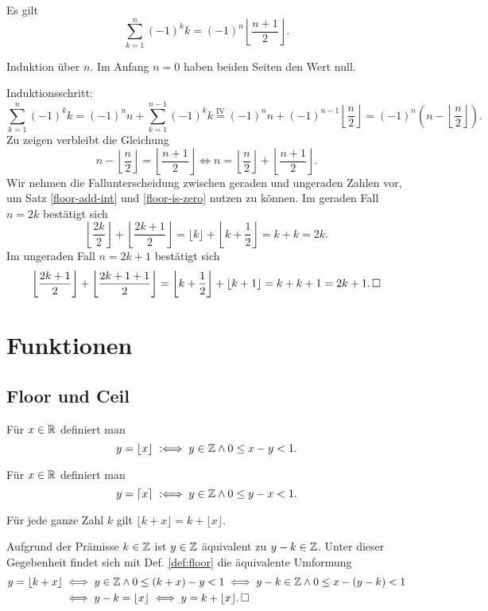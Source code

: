 \newpage
\begin{Satz} Es gilt
\[\sum_{k=1}^n (-1)^k k = (-1)^n\left\lfloor\frac{n+1}{2}\right\rfloor.\]
\end{Satz}
\begin{Beweis}
Induktion über $n$. Im Anfang $n=0$ haben beiden Seiten den Wert null.

Induktionsschritt:
\[\sum_{k=1}^n (-1)^k k = (-1)^n n + \sum_{k=1}^{n-1} (-1)^k k
\stackrel{\mathrm{IV}}= (-1)^n n + (-1)^{n-1}\left\lfloor\frac{n}{2}\right\rfloor
= (-1)^n (n-\left\lfloor\frac{n}{2}\right\rfloor).\]
Zu zeigen verbleibt die Gleichung
\[n-\left\lfloor\frac{n}{2}\right\rfloor = \left\lfloor\frac{n+1}{2}\right\rfloor
\iff n = \left\lfloor\frac{n}{2}\right\rfloor + 
\left\lfloor\frac{n+1}{2}\right\rfloor.\]
Wir nehmen die Fallunterscheidung zwischen geraden und ungeraden
Zahlen vor, um Satz \ref{floor-add-int} und \ref{floor-is-zero}
nutzen zu können. Im geraden Fall $n=2k$ bestätigt sich
\[\left\lfloor\frac{2k}{2}\right\rfloor +  \left\lfloor\frac{2k+1}{2}\right\rfloor
= \lfloor k\rfloor + \left\lfloor k + \frac{1}{2}\right\rfloor = k + k = 2k.\]
Im ungeraden Fall $n=2k+1$ bestätigt sich
\[\left\lfloor\frac{2k+1}{2}\right\rfloor + \left\lfloor\frac{2k+1+1}{2}\right\rfloor
= \left\lfloor k + \frac{1}{2}\right\rfloor + \left\lfloor k+1\right\rfloor
= k + k + 1 = 2k + 1.\,\square\]
\end{Beweis}

\section{Funktionen}

\subsection{Floor und Ceil}

\begin{Definition}[Floorfunktion]%
\label{def:floor}
Für $x\in\mathbb R$ definiert man
\[y = \lfloor x\rfloor\;:\Longleftrightarrow\; y\in\mathbb Z\land 0\le x-y < 1.\]
\end{Definition}

\begin{Definition}[Ceilfunktion]%
\label{def:ceil}
Für $x\in\mathbb R$ definiert man
\[y = \lceil x\rceil\;:\Longleftrightarrow\; y\in\mathbb Z\land 0\le y-x < 1.\]
\end{Definition}

\begin{Satz}\label{floor-add-int}
Für jede ganze Zahl $k$ gilt $\lfloor k + x\rfloor = k + \lfloor x\rfloor$.
\end{Satz}
\begin{Beweis} Aufgrund der Prämisse $k\in\mathbb Z$ ist $y\in\mathbb Z$ äquivalent
zu $y-k\in\mathbb Z$. Unter dieser Gegebenheit findet sich mit
Def. \ref{def:floor} die äquivalente Umformung
\begin{align*}
y = \lfloor k+x\rfloor &\iff y\in\mathbb Z\land 0\le (k+x)-y < 1\iff y-k\in\mathbb Z\land 0\le x-(y-k) < 1\\
&\iff y - k = \lfloor x\rfloor \iff y = k + \lfloor x\rfloor.\,\square
\end{align*}
\end{Beweis}

